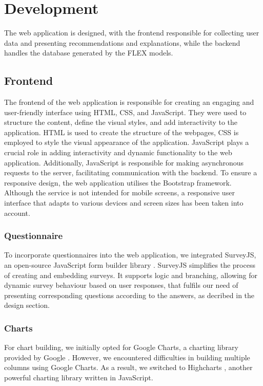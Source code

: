 \chapter{Development}

The web application is designed, 
with the frontend responsible for collecting user data and presenting recommendations and explanations, 
while the backend handles the database generated by the FLEX models. 


\section{Frontend}

The frontend of the web application is responsible for creating an engaging and user-friendly interface using HTML, CSS, and JavaScript. 
They were used to structure the content, define the visual styles, and add interactivity to the application.
HTML is used to create the structure of the webpages, CSS is employed to style the visual appearance of the application. 
JavaScript plays a crucial role in adding interactivity and dynamic functionality to the web application. 
Additionally, JavaScript is responsible for making asynchronous requests to the server, facilitating communication with the backend.
To ensure a responsive design, the web application utilises the Bootstrap framework. 
Although the service is not intended for mobile screens, a responsive user interface that adapts to various devices and screen sizes has been taken into account. 


\subsection{Questionnaire}

To incorporate questionnaires into the web application, we integrated SurveyJS, an open-source JavaScript form builder library \cite{surveyjs}. 
SurveyJS simplifies the process of creating and embedding surveys.
It supports logic and branching, allowing for dynamic survey behaviour based on user responses, 
that fulfils our need of presenting corresponding questions according to the answers, as decribed in the design section. 


\subsection{Charts}

For chart building, we initially opted for Google Charts, a charting library provided by Google \cite{googlecharts}. 
However, we encountered difficulties in building multiple columns using Google Charts. 
As a result, we switched to Highcharts \cite{highcharts}, another powerful charting library written in JavaScript. 


